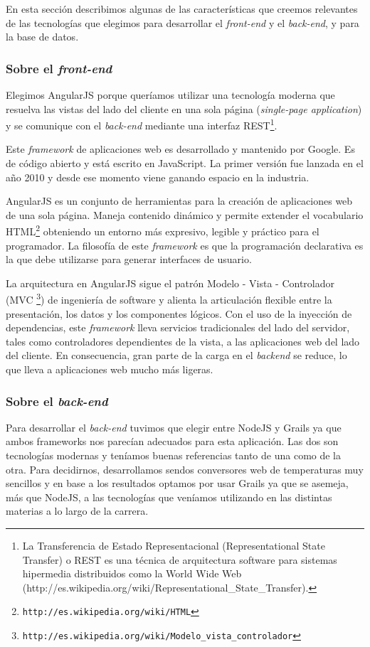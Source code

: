 En esta sección describimos algunas de las características que creemos relevantes de las tecnologías que elegimos para desarrollar el \textit{front-end} y el \textit{back-end}, y para la base de datos.

\subsubsection{Sobre el \textit{front-end}}
Elegimos AngularJS porque queríamos utilizar una tecnología moderna que resuelva las vistas del lado del cliente en una sola página (\textit{single-page application}) y se comunique con el \textit{back-end} mediante una interfaz REST\footnote{La Transferencia de Estado Representacional (Representational State Transfer) o REST es una técnica de arquitectura software para sistemas hipermedia distribuidos como la World Wide Web (http://es.wikipedia.org/wiki/Representational\_State\_Transfer).}.

Este \textit{framework} de aplicaciones web es desarrollado y mantenido por Google. Es de código abierto y está escrito en JavaScript. La primer versión fue lanzada en el año 2010 y desde ese momento viene ganando espacio en la industria. 

AngularJS es un conjunto de herramientas para la creación de aplicaciones web de una sola página. Maneja contenido dinámico y permite extender el vocabulario HTML\footnote{\texttt{http://es.wikipedia.org/wiki/HTML}} obteniendo un entorno más expresivo, legible y práctico para el programador. La filosofía de este \textit{framework} es que la programación declarativa es la que debe utilizarse para generar interfaces de usuario.

La arquitectura en AngularJS sigue el patrón Modelo - Vista - Controlador (MVC  \footnote{\texttt{http://es.wikipedia.org/wiki/Modelo\_vista\_controlador}}) de ingeniería de software y alienta la articulación flexible entre la presentación, los datos y los componentes lógicos. Con el uso de la inyección de dependencias, este \textit{framework} lleva servicios tradicionales del lado del servidor, tales como controladores dependientes de la vista, a las aplicaciones web del lado del cliente. En consecuencia, gran parte de la carga en el \textit{backend} se reduce, lo que lleva a aplicaciones web mucho más ligeras.

\subsubsection{Sobre el \textit{back-end}}
Para desarrollar el \textit{back-end} tuvimos que elegir entre NodeJS y Grails ya que ambos frameworks nos parecían adecuados para esta aplicación. Las dos son tecnologías modernas y teníamos buenas referencias tanto de una como de la otra. Para decidirnos, desarrollamos sendos conversores web de temperaturas muy sencillos y en base a los resultados optamos por usar Grails ya que se asemeja, más que NodeJS, a las tecnologías que veníamos utilizando en las distintas materias a lo largo de la carrera.

